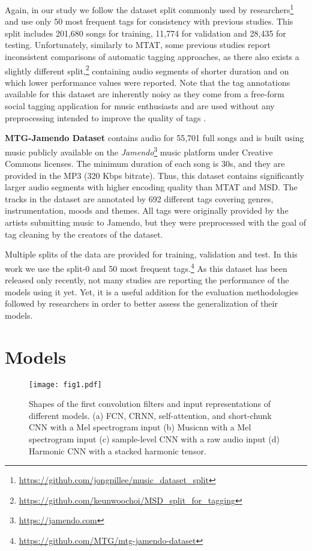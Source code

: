\documentclass{article}
\begin{document}
Again, in our study we follow the dataset split commonly used by researchers\footnote{\url{https://github.com/jongpillee/music_dataset_split}}~\cite{lee2017sample,pons2018end} and use only 50 most frequent tags for consistency with previous studies. This split includes 201{,}680 songs for training, 11{,}774 for validation and 28{,}435 for testing. 
Unfortunately, similarly to MTAT, some previous studies report inconsistent comparisons of automatic tagging approaches, as there also exists a slightly different split,\footnote{\url{https://github.com/keunwoochoi/MSD_split_for_tagging}} containing audio segments of shorter duration and on which lower performance values were reported. 
Note that the tag annotations available for this dataset are inherently noisy as they come from a free-form social tagging application for music enthusiasts and are used without any preprocessing intended to improve the quality of tags \cite{choi2017effects}.





\noindent\textbf{MTG-Jamendo Dataset} \cite{bogdanov2019mtg} contains audio for 55,701 full songs and is built using music publicly available on the \textit{Jamendo}\footnote{\url{https://jamendo.com}} music platform under Creative Commons licenses.
The minimum duration of each song is 30s, and they are provided in the MP3 (320 Kbps bitrate). Thus, this dataset contains significantly larger audio segments with higher encoding quality than MTAT and MSD. The tracks in the dataset are annotated by 692 different tags covering genres, instrumentation, moods and themes. All tags were originally provided by the artists submitting music to Jamendo, but they were preprocessed with the goal of tag cleaning by the creators of the dataset.

Multiple splits of the data are provided for training, validation and test. In this work we use the split-0 and 50 most frequent tags.\footnote{\url{https://github.com/MTG/mtg-jamendo-dataset}} 
As this dataset has been released only recently, not many studies are reporting the performance of the models using it yet. Yet, it is a useful addition for the evaluation methodologies followed by researchers in order to better assess the generalization of their models. 



 \section{Models}\label{sec:models}
\begin{figure*}[t!]
    \centering
    \texttt{[image: fig1.pdf]} 
    \caption{Shapes of the first convolution filters and input representations of different models. (a) FCN, CRNN, self-attention, and short-chunk CNN with a Mel spectrogram input (b) Musicnn with a Mel spectrogram input (c) sample-level CNN with a raw audio input (d) Harmonic CNN with a stacked harmonic tensor.}
    \label{fig:models}
\end{figure*}
\end{document}

